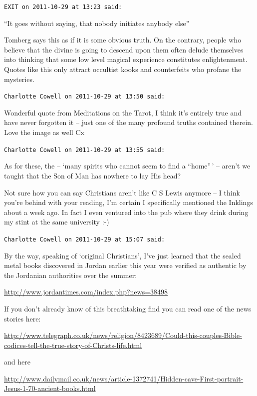 \begin{footnotesize}
\begin{sffamily}
\texttt{EXIT on 2011-10-29 at 13:23 said:}

``It goes without saying, that nobody initiates anybody else''

Tomberg says this as if it is some obvious truth. On the contrary, people who believe that the divine is going to descend upon them often delude themselves into thinking that some low level magical experience constitutes enlightenment. Quotes like this only attract occultist kooks and counterfeits who profane the mysteries.

\hfill

\texttt{Charlotte Cowell on 2011-10-29 at 13:50 said:}

Wonderful quote from Meditations on the Tarot, I think it's entirely true and have never forgotten it -- just one of the many profound truths contained therein. Love the image as well Cx

\hfill

\texttt{Charlotte Cowell on 2011-10-29 at 13:55 said:}

As for these, the -- `many spirits who cannot seem to find a ``home''\,' -- aren't we taught that the Son of Man has nowhere to lay His head?

Not sure how you can say Christians aren't like C S Lewis anymore -- I think you're behind with your reading, I'm certain I specifically mentioned the Inklings about a week ago. In fact I even ventured into the pub where they drink during my stint at the same university :-)

\hfill

\texttt{Charlotte Cowell on 2011-10-29 at 15:07 said:}

By the way, speaking of `original Christians', I've just learned that the sealed metal books discovered in Jordan earlier this year were verified as authentic by the Jordanian authorities over the summer:

\url{http://www.jordantimes.com/index.php?news=38498}


If you don't already know of this breathtaking find you can read one of the news stories here:

\url{http://www.telegraph.co.uk/news/religion/8423689/Could-this-couples-Bible-codices-tell-the-true-story-of-Christs-life.html}


and here

\url{http://www.dailymail.co.uk/news/article-1372741/Hidden-cave-First-portrait-Jesus-1-70-ancient-books.html}



\end{sffamily}
\end{footnotesize}
